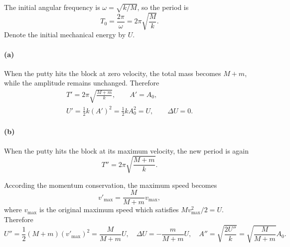 \documentclass{article}
\begin{document}
\begin{solution}
	The initial angular frequency is $\omega = \sqrt{k/M}$, so the period is
	\[ T_0 = \frac{2\pi}{\omega} = 2\pi\sqrt{\frac{M}{k}}. \]
	Denote the initial mechanical energy by $U$.

	\paragraph{(a)} When the putty hits the block at zero velocity, the total mass becomes $M+m$, while the amplitude remains unchanged. Therefore
	\begin{gather*}
		T' = 2\pi\sqrt{\frac{M+m}{k}}, \qquad A' = A_0, \\
		U' = \frac12 k(A')^2 = \frac12 kA_0^2 = U, \qquad \Delta U = 0.
	\end{gather*}

	\paragraph{(b)} When the putty hits the block at its maximum velocity, the new period is again
	\[ T'' = 2\pi\sqrt{\frac{M+m}{k}}. \]

	According the momentum conservation, the maximum speed becomes 
	\[ v'_{\mathrm{max}} = \frac{M}{M+m}v_{\mathrm{max}}, \]
	where $v_{\mathrm{max}}$ is the original maximum speed which satisfies $M v_{\mathrm{max}}^2/2 = U$. Therefore
	\[ U'' = \frac{1}{2}(M+m)(v'_{\mathrm{max}})^{2} = \frac{M}{M+m}U, \quad \Delta U = -\frac{m}{M+m}U, \quad A'' = \sqrt{\frac{2U''}{k}} = \sqrt{\frac{M}{M+m}}A_0. \]
\end{solution}
\end{document}
